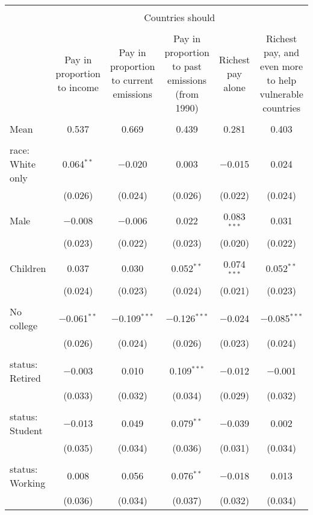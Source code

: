 
\begin{tabular}{@{\extracolsep{5pt}}lccccc} 
\\[-1.8ex]\hline 
\hline \\[-1.8ex] 
 & \multicolumn{5}{c}{Countries should} \\ 
\cline{2-6} 
\\[-1.8ex] & Pay in proportion to income & Pay in proportion to current emissions & Pay in proportion to past emissions (from 1990) & Richest pay alone & Richest pay, and even more to help vulnerable countries \\ 
\hline \\[-1.8ex] 
 Mean & 0.537 & 0.669 & 0.439 & 0.281 & 0.403  \\ \hline \\[-1.8ex] race: White only & 0.064$^{**}$ & $-$0.020 & 0.003 & $-$0.015 & 0.024 \\ 
  & (0.026) & (0.024) & (0.026) & (0.022) & (0.024) \\ 
  & & & & & \\ 
 Male & $-$0.008 & $-$0.006 & 0.022 & 0.083$^{***}$ & 0.031 \\ 
  & (0.023) & (0.022) & (0.023) & (0.020) & (0.022) \\ 
  & & & & & \\ 
 Children & 0.037 & 0.030 & 0.052$^{**}$ & 0.074$^{***}$ & 0.052$^{**}$ \\ 
  & (0.024) & (0.023) & (0.024) & (0.021) & (0.023) \\ 
  & & & & & \\ 
 No college & $-$0.061$^{**}$ & $-$0.109$^{***}$ & $-$0.126$^{***}$ & $-$0.024 & $-$0.085$^{***}$ \\ 
  & (0.026) & (0.024) & (0.026) & (0.023) & (0.024) \\ 
  & & & & & \\ 
 status: Retired & $-$0.003 & 0.010 & 0.109$^{***}$ & $-$0.012 & $-$0.001 \\ 
  & (0.033) & (0.032) & (0.034) & (0.029) & (0.032) \\ 
  & & & & & \\ 
 status: Student & $-$0.013 & 0.049 & 0.079$^{**}$ & $-$0.039 & 0.002 \\ 
  & (0.035) & (0.034) & (0.036) & (0.031) & (0.034) \\ 
  & & & & & \\ 
 status: Working & 0.008 & 0.056 & 0.076$^{**}$ & $-$0.018 & 0.013 \\ 
  & (0.036) & (0.034) & (0.037) & (0.032) & (0.034) \\ 

\end{tabular}
